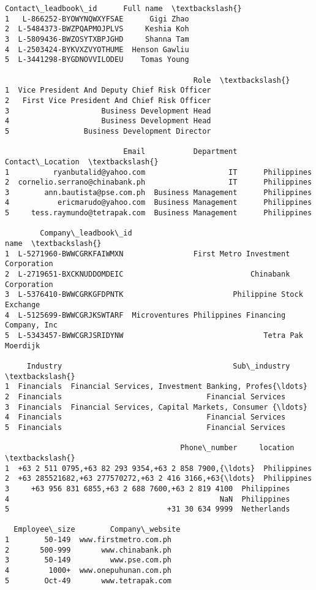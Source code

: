 \documentclass[11pt]{article}
\makeatletter
\newcommand{\boxspacing}{\kern\kvtcb@left@rule\kern\kvtcb@boxsep}
\newcommand{\prompt}[4]{
        \ttfamily\llap{{\color{#2}[#3]:\hspace{3pt}#4}}\vspace{-\baselineskip}
    }
\makeatother
\begin{document}
            \begin{tcolorbox}[breakable, size=fbox, boxrule=.5pt, pad at break*=1mm, opacityfill=0]
\prompt{Out}{outcolor}{5}{\boxspacing}
\begin{Verbatim}[commandchars=\\\{\}]
        Contact\_leadbook\_id      Full name  \textbackslash{}
1   L-866252-BYOWYNQWXYFSAE      Gigi Zhao
2  L-5484373-BWZPQAPMOJPLVS     Keshia Koh
3  L-5809436-BWZOSYTXBPJGHD     Shanna Tam
4  L-2503424-BYKVXZVYOTHUME  Henson Gawliu
5  L-3441298-BYGDNOVVILODEU    Tomas Young

                                           Role  \textbackslash{}
1  Vice President And Deputy Chief Risk Officer
2   First Vice President And Chief Risk Officer
3                     Business Development Head
4                     Business Development Head
5                 Business Development Director

                           Email           Department Contact\_Location  \textbackslash{}
1          ryanbutalid@yahoo.com                   IT      Philippines
2  cornelio.serrano@chinabank.ph                   IT      Philippines
3        ann.bautista@pse.com.ph  Business Management      Philippines
4           ericmarudo@yahoo.com  Business Management      Philippines
5     tess.raymundo@tetrapak.com  Business Management      Philippines

        Company\_leadbook\_id                                              name  \textbackslash{}
1  L-5271960-BWWCGRKFAIWMXN                First Metro Investment Corporation
2  L-2719651-BXCKNUDDOMDEIC                             Chinabank Corporation
3  L-5376410-BWWCGRKGFDPNTK                         Philippine Stock Exchange
4  L-5125699-BWWCGRJKSWTARF  Microventures Philippines Financing Company, Inc
5  L-5343457-BWWCGRJSRIDYNW                                Tetra Pak Moerdijk

     Industry                                       Sub\_industry  \textbackslash{}
1  Financials  Financial Services, Investment Banking, Profes{\ldots}
2  Financials                                 Financial Services
3  Financials  Financial Services, Capital Markets, Consumer {\ldots}
4  Financials                                 Financial Services
5  Financials                                 Financial Services

                                        Phone\_number     location  \textbackslash{}
1  +63 2 511 0795,+63 82 293 9354,+63 2 858 7900,{\ldots}  Philippines
2  +63 285521682,+63 277570272,+63 2 416 3166,+63{\ldots}  Philippines
3     +63 956 831 6855,+63 2 688 7600,+63 2 819 4100  Philippines
4                                                NaN  Philippines
5                                    +31 30 634 9999  Netherlands

  Employee\_size        Company\_website
1        50-149  www.firstmetro.com.ph
2       500-999       www.chinabank.ph
3        50-149         www.pse.com.ph
4         1000+  www.onepuhunan.com.ph
5        Oct-49       www.tetrapak.com
\end{Verbatim}
\end{tcolorbox}
        
\end{document}
